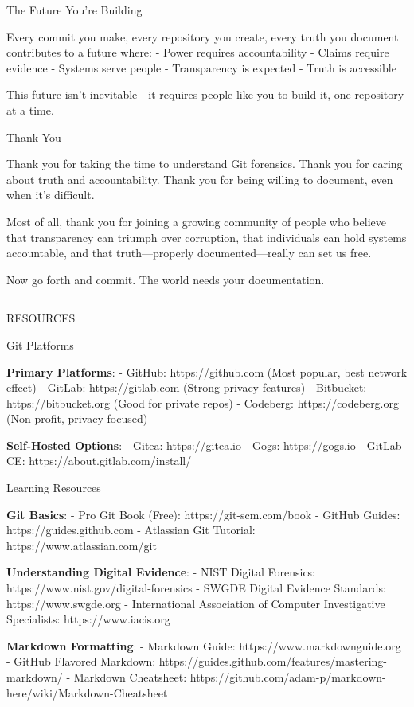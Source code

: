 The Future You're Building

Every commit you make, every repository you create, every truth you
document contributes to a future where: - Power requires accountability
- Claims require evidence - Systems serve people - Transparency is
expected - Truth is accessible

This future isn't inevitable---it requires people like you to build it,
one repository at a time.

Thank You

Thank you for taking the time to understand Git forensics. Thank you for
caring about truth and accountability. Thank you for being willing to
document, even when it's difficult.

Most of all, thank you for joining a growing community of people who
believe that transparency can triumph over corruption, that individuals
can hold systems accountable, and that truth---properly
documented---really can set us free.

Now go forth and commit. The world needs your documentation.

\begin{center}\rule{0.5\linewidth}{0.5pt}\end{center}

RESOURCES

Git Platforms

\textbf{Primary Platforms}: - GitHub: https://github.com (Most popular,
best network effect) - GitLab: https://gitlab.com (Strong privacy
features) - Bitbucket: https://bitbucket.org (Good for private repos) -
Codeberg: https://codeberg.org (Non-profit, privacy-focused)

\textbf{Self-Hosted Options}: - Gitea: https://gitea.io - Gogs:
https://gogs.io - GitLab CE: https://about.gitlab.com/install/

Learning Resources

\textbf{Git Basics}: - Pro Git Book (Free): https://git-scm.com/book -
GitHub Guides: https://guides.github.com - Atlassian Git Tutorial:
https://www.atlassian.com/git

\textbf{Understanding Digital Evidence}: - NIST Digital Forensics:
https://www.nist.gov/digital-forensics - SWGDE Digital Evidence
Standards: https://www.swgde.org - International Association of Computer
Investigative Specialists: https://www.iacis.org

\textbf{Markdown Formatting}: - Markdown Guide:
https://www.markdownguide.org - GitHub Flavored Markdown:
https://guides.github.com/features/mastering-markdown/ - Markdown
Cheatsheet:
https://github.com/adam-p/markdown-here/wiki/Markdown-Cheatsheet

